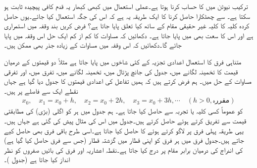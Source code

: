\quad
ترکیب نیوٹن میں  کا حساب کرنا ہوتا ہے۔عملی استعمال میں کبھی کبھار یہ قدم کافی پیچیدہ ثابت ہو سکتا ہے۔ سے چھٹکارا حاصل کرنا کا ایک طریقہ یہ ہے کہ اس کی جگہ  استعمال کیا جائے۔یوں حاصل کردہ کلیہ کا کلیہ غیر حقیقی مقام کے ساتھ کیا تعلق پایا جاتا ہے؟
\quad
فرض کریں بند وقفہ  میں  استمراری ہے اور اس کا سعت بھی  میں پایا جاتا ہے۔ دکھائیں کہ مساوات  کا کم از کم ایک حل اس وقفہ میں پایا جائے گا۔دکھائیں کہ اس وقفہ میں مساوات کے زیادہ جذر بھی ممکن ہیں۔

متناہی فرق کا استعمال اعدادی تجزیہ کے کئی شاخوں میں پایا جاتا ہے مثلاً دو قیمتوں کے درمیان قیمت کا تخمینہ لگانے میں، جدول کی جانچ پڑتال میں، تخمینہ لگانے میں، تفرق میں، اور تفرقی مساوات کے حل میں۔ ہم فرض کرتے ہیں کہ ہمیں تفاعل  کی اعدادی قیمتوں   کا جدول دیا گیا ہے جہاں نقطے  ایک سے فاصلے پر ہیں۔ 
\begin{align*}
x_0,\quad x_1=x_0+h,\quad x_2=x_0+2h,\quad x_3=x_0+3h,\cdots \quad (h>0, \text{مقررہ})
\end{align*}
 کو عموماً کسی کلیہ یا تجربہ سے حاصل کیا جاتا ہے۔ ہم جدول میں ہر   کو اگلی (بڑی)  کی مطابقتی قیمت سے تفریق کرتے ہوئے  حاصل کرتے ہیں۔جدول  میں اس کی مثال پیش کی گئی ہے جہاں  ہیں۔یہی طریقہ پہلی فرق پر لاگو کرتے ہوئے  کا  حاصل کیا جاتا ہے۔اسی طرح باقی فرق بھی حاصل کیے جاتے ہیں۔جدول فرق میں ہر فرق کو اپنی قطار میں گزشتہ قطار (جس سے فرق حاصل کیا گیا ہے) کی اندراج کی درمیان برابر  مقام پر درج کیا جاتا ہے۔نقطہ اعشاریہ اور فرق کی بائیں صفروں کو نظر انداز کیا جاتا ہے (جدول )۔ 

